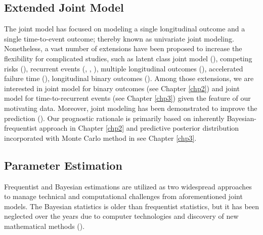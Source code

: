 \subsection{Extended Joint Model}

The joint model has focused on modeling a single longitudinal outcome and a single time-to-event outcome; thereby known as univariate joint modeling. Nonetheless, a vast number of extensions have been proposed to increase the flexibility for complicated studies, such as latent class joint model (\cite{Proust-Lima2014}), competing risks (\cite{Andrinopoulou2017}), recurrent events (\cite{Krol2016}, \cite{Hickey2018}, \cite{Ren2021}), multiple longitudinal outcomes (\cite{Musoro2015}), accelerated failure time (\cite{Luo2014a}), longitudinal binary outcomes (\cite{Horrocks2009}). Among those extensions, we are interested in joint model for binary outcomes (see Chapter \ref{chp2}) and joint model for time-to-recurrent events (see Chapter \ref{chp3}) given the feature of our motivating data. Moreover, joint modeling has been demonstrated to improve the prediction (\cite{Rizopoulos2014}). Our prognostic rationale is primarily based on inherently Bayesian-frequentist approach in Chapter \ref{chp2} and 
predictive posterior distribution incorporated with Monte Carlo method in see Chapter \ref{chp3}. 


\subsection{Parameter Estimation}

Frequentist and Bayesian estimations are utilized as two widespread approaches to manage technical and computational challenges from aforementioned joint models. The Bayesian statistics is older than frequentist statistics, but it has been neglected over the years due to computer technologies and discovery of new mathematical methods (\cite{Hackenberger2019}). 

